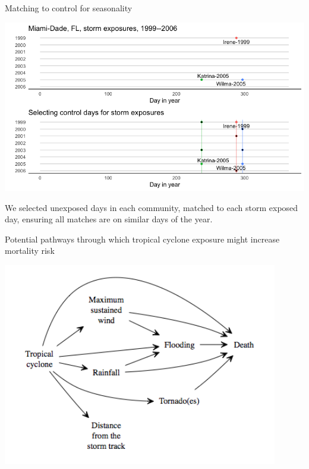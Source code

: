 \documentclass[ignorenonframetext,]{beamer}
\begin{document}
\begin{frame}{Matching to control for seasonality}

\begin{center}\includegraphics[width=\textwidth]{figures/example_picking_controls} \end{center}

\small We selected unexposed days in each community, matched to each
storm exposed day, ensuring all matches are on similar days of the year.

\end{frame}

\begin{frame}{Potential pathways through which tropical cyclone exposure
might increase mortality risk}

\begin{center}\includegraphics[width=0.9\textwidth]{figures/storm_death_pathways} \end{center}

\end{frame}
\end{document}
